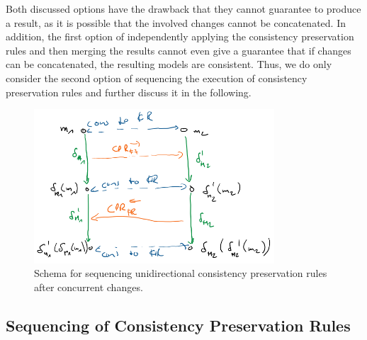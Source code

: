 Both discussed options have the drawback that they cannot guarantee to produce a result, as it is possible that the involved changes cannot be concatenated.
In addition, the first option of independently applying the consistency preservation rules and then merging the results cannot even give a guarantee that if changes can be concatenated, the resulting models are consistent.
Thus, we do only consider the second option of sequencing the execution of consistency preservation rules and further discuss it in the following.



\begin{figure}
    \centering
    \includegraphics[width=0.8\textwidth]{figures/correctness/synchronization/sequencing_schema.png}
    \caption[Sequencing unidirectional consistency preservation rules]{Schema for sequencing unidirectional consistency preservation rules after concurrent changes.}
    \label{fig:synchronization:sequencing_schema}
\end{figure}

\subsection{Sequencing of Consistency Preservation Rules}
\label{chap:synchronization:combination:sequencing}

